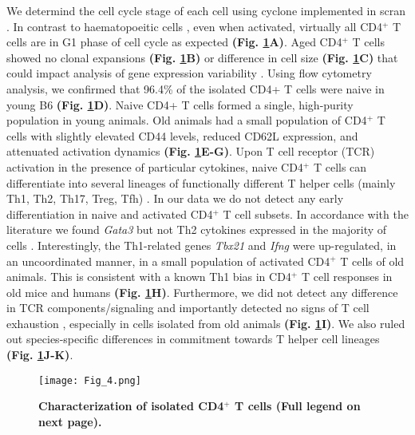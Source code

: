 We determind the cell cycle stage of each cell using cyclone \citep{Scialdione2015} implemented in scran \citep{Scran}.
In contrast to haematopoeitic cells \citep{Kowalczyk2015}, even when activated, virtually all CD4$^+$ T cells are in G1 phase of cell cycle as expected \textbf{(Fig. \ref{fig1:characterization}A)}. Aged CD4$^+$ T cells showed no clonal expansions \textbf{(Fig. \ref{fig1:characterization}B)} or difference in cell size \textbf{(Fig. \ref{fig1:characterization}C)} that could impact analysis of gene expression variability \citep{Stubbington2015}. Using flow cytometry analysis, we confirmed that 96.4\% of the isolated CD4+ T cells were naive in young B6 \textbf{(Fig. \ref{fig1:characterization}D)}. Naive CD4+ T cells formed a single, high-purity population in young animals. Old animals had a small population of CD4$^+$ T cells with slightly elevated CD44 levels, reduced CD62L expression, and attenuated activation dynamics \textbf{(Fig. \ref{fig1:characterization}E-G)}. Upon T cell receptor (TCR) activation in the presence of particular cytokines, naive CD4$^+$ T cells can differentiate into several lineages of functionally different T helper cells (mainly Th1, Th2, Th17, Treg, Tfh) \citep{Stubbington2015, Zhu2010}. In our data we do not detect any early differentiation in naive and activated CD4$^+$ T cell subsets. In accordance with the literature we found \textit{Gata3} but not Th2 cytokines expressed in the majority of cells  \citep{Ho2009}. Interestingly, the Th1-related genes \textit{Tbx21} and \textit{Ifng} were up-regulated, in an uncoordinated manner, in a small population of activated CD4$^+$ T cells of old animals. This is consistent with a known Th1 bias in CD4$^+$ T cell responses in old mice \citep{Zhang2014} and humans \citep{Sakata-Kaneko2000} \textbf{(Fig. \ref{fig1:characterization}H)}. Furthermore, we did not detect any difference in TCR components/signaling and importantly detected no signs of T cell exhaustion \citep{Wherry2011}, especially in cells isolated from old animals \textbf{(Fig. \ref{fig1:characterization}I)}. We also ruled out species-specific differences in commitment towards T helper cell lineages \textbf{(Fig. \ref{fig1:characterization}J-K)}. \\

\begin{figure}[!hb]
\centering
\texttt{[image: Fig\_4.png]}
\caption[Characterization of isolated CD4$^+$ T cells]{\textbf{Characterization of isolated CD4$^+$ T cells (Full legend on next page).}}
\label{fig1:characterization}
\end{figure}

